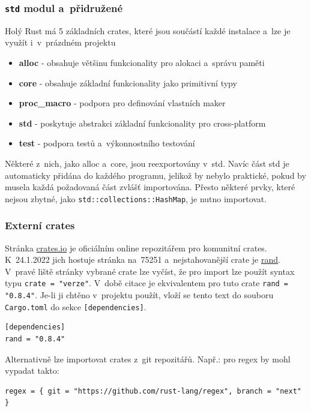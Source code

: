 \documentclass[a4paper, 12pt]{article} %
\newcommand{\rust}[1]{\texttt{#1}}
\begin{document}
        \subsubsection*{\rust{std} modul a~přidružené}
            Holý Rust má 5 základních crates, které jsou součástí každé instalace a~lze je využít i~v~prázdném projektu
            \begin{itemize}
                \item \textbf{alloc} - obsahuje většinu funkcionality pro alokaci a~správu paměti
                \item \textbf{core} - obsahuje základní funkcionality jako primitivní typy
                \item \textbf{proc\_macro} - podpora pro definování vlastních maker
                \item \textbf{std} - poskytuje abstrakci základní funkcionality pro cross-platform
                \item \textbf{test} - podpora testů a~výkonnostního testování
            \end{itemize}

            Některé z~nich, jako alloc a~core, jsou reexportovány v~std. Navíc část std je automaticky přidána do každého programu, jelikož by nebylo praktické, pokud by musela každá požadovaná část zvlášť importována. Přesto některé prvky, které nejsou zbytné, jako \rust{std::collections::HashMap}, je nutno importovat.

        \subsubsection*{Externí crates}
            Stránka \href{https://crates.io/}{crates.io} je oficiálním online repozitářem pro komunitní crates. K~24.1.2022 jich hostuje stránka na~75251 a~nejstahovanější crate je \href{https://crates.io/crates/rand}{rand}. V~pravé liště stránky vybrané crate lze vyčíst, že pro import lze použít syntax typu \texttt{crate = "verze"}. V~době citace je ekvivalentem pro tuto crate \texttt{rand = "0.8.4"}. Je-li ji chtěno v~projektu použít, vloží se tento text do souboru \texttt{Cargo.toml} do sekce \texttt{[dependencies]}.
            \begin{verbatim}
[dependencies]
rand = "0.8.4"
            \end{verbatim}
        
            Alternativně lze importovat crates z~git repozitářů. Např.: pro regex by mohl vypadat takto:
            \begin{verbatim}
regex = { git = "https://github.com/rust-lang/regex", branch = "next" }
            \end{verbatim}
\end{document}
